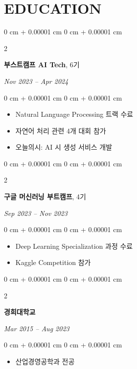 \documentclass[10pt, letterpaper]{article}
\newenvironment{highlights}{
    \begin{itemize}[
        topsep=0.10 cm,
        parsep=0.10 cm,
        partopsep=0pt,
        itemsep=0pt,
        leftmargin=0 cm + 10pt
    ]
}{
    \end{itemize}
} %
\newenvironment{onecolentry}{
    \begin{adjustwidth}{
        0 cm + 0.00001 cm
    }{
        0 cm + 0.00001 cm
    }
}{
    \end{adjustwidth}
} %
\newenvironment{twocolentry}[2][]{
    \onecolentry
    \def\secondColumn{\textit{#2}}
    \setcolumnwidth{\fill, 4.5 cm}
    \begin{paracol}{2}
}{
    \switchcolumn \raggedleft \secondColumn
    \end{paracol}
    \endonecolentry
} %
\begin{document}
    \vspace{5 pt - 0.3 cm}
    \section{EDUCATION}
        \begin{twocolentry}{
            Nov 2023 -- Apr 2024
        }
            \textbf{부스트캠프 AI Tech}, 6기
        \end{twocolentry}

        \vspace{0.10 cm}
        \begin{onecolentry}
            \begin{highlights}
                \item Natural Language Processing 트랙 수료
                \item 자연어 처리 관련 4개 대회 참가
                \item 오늘의시: AI 시 생성 서비스 개발
            \end{highlights}
        \end{onecolentry}

        \vspace{0.2 cm}
        \begin{twocolentry}{
            Sep 2023 -- Nov 2023
        }
            \textbf{구글 머신러닝 부트캠프}, 4기
        \end{twocolentry}

        \vspace{0.10 cm}
        \begin{onecolentry}
            \begin{highlights}
                \item Deep Learning Specialization 과정 수료
                \item Kaggle Competition 참가
            \end{highlights}
        \end{onecolentry}

        \vspace{0.2 cm}
        \begin{twocolentry}{
            Mar 2015 -- Aug 2023
        }
            \textbf{경희대학교}
        \end{twocolentry}

        \vspace{0.10 cm}
        \begin{onecolentry}
            \begin{highlights}
                \item 산업경영공학과 전공
            \end{highlights}
        \end{onecolentry}
\end{document}
